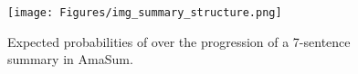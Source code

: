\begin{figure}
  \centering
  \texttt{[image: Figures/img\_summary\_structure.png]}
  \caption{Expected probabilities of \taxtypes{} over the progression of a 7-sentence summary in AmaSum.}
  \label{fig_summary_structure}
\end{figure}